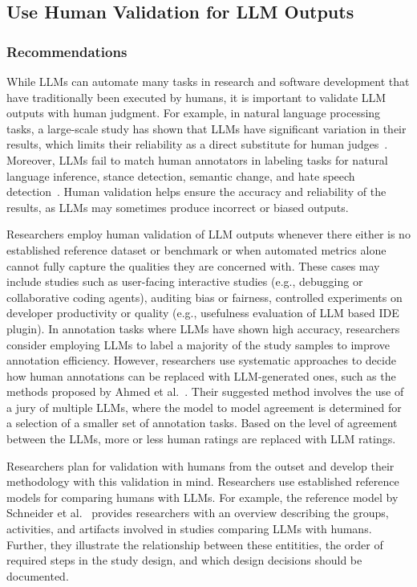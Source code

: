 



\subsection{Use Human Validation for LLM Outputs}

\subsubsection{Recommendations}

While LLMs can automate many tasks in research and software development that have traditionally been executed by humans, it is important to validate LLM outputs with human judgment.
For example, in natural language processing tasks, a large-scale study has shown that LLMs have significant variation in their results, which limits their reliability as a direct substitute for human judges~\cite{DBLP:journals/corr/abs-2406-18403}. 
Moreover, LLMs fail to match human annotators in labeling tasks for natural language inference, stance detection, semantic change, and hate speech detection~\cite{DBLP:conf/chi/Wang0RMM24}.
Human validation helps ensure the accuracy and reliability of the results, as LLMs may sometimes produce incorrect or biased outputs.

Researchers \should employ human validation of LLM outputs whenever there either is no established reference dataset or benchmark or when automated metrics alone cannot fully capture the qualities they are concerned with.
These cases may include studies such as user-facing interactive studies (e.g., debugging or collaborative coding agents), auditing bias or fairness, controlled experiments on developer productivity or quality (e.g., usefulness evaluation of LLM based IDE plugin).
In annotation tasks where LLMs have shown high accuracy, researchers \may consider employing LLMs to label a majority of the study samples to improve annotation efficiency.
However, researchers \should use systematic approaches to decide how human annotations can be replaced with LLM-generated ones, such as the methods proposed by Ahmed et al.~\cite{DBLP:journals/corr/abs-2408-05534}.
Their suggested method involves the use of a jury of multiple LLMs, where the model to model agreement is determined for a selection of a smaller set of annotation tasks.
Based on the level of agreement between the LLMs, more or less human ratings are replaced with LLM ratings.

Researchers \should plan for validation with humans from the outset and develop their methodology with this validation in mind.
Researchers \should use established reference models for comparing humans with LLMs.
For example, the reference model by Schneider et al.~\cite{Schneider2025ReferenceModel} provides researchers with an overview describing the groups, activities, and artifacts involved in studies comparing LLMs with humans.
Further, they illustrate the relationship between these entitities, the order of required steps in the study design, and which design decisions should be documented.

